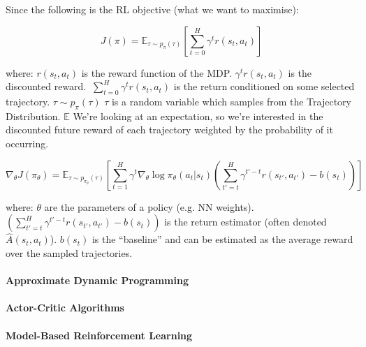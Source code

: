 \documentclass{article}
\begin{document}
Since the following is the RL objective (what we want to maximise):

\begin{equation}
\label{eq:1}
J(\pi) = \mathbb{E}_{\tau \sim p_\pi (\tau)} \left[ \sum_{t=0}^H \gamma^t r(s_t, a_t) \right ]
\end{equation}

where: \(r(s_t, a_t)\) is the reward function of the MDP. \(\gamma^t r(s_t , a_t)\) is the discounted reward. \(\ \sum_{t=0}^H \gamma^t r(s_t, a_t) \) is the return conditioned on some selected trajectory. \(\tau \sim p_\pi(\tau)\)
\(\tau\) is a random variable which samples from the Trajectory Distribution. \(\mathbb{E}\) We're looking at an expectation, so we're interested in the discounted future reward of each trajectory weighted by the probability of it occurring.

\begin{equation}
\label{eq:2}
\nabla_\theta J(\pi_\theta) = \mathbb{E}_{\tau \sim p_{\pi_\theta} (\tau)} \left [ \sum_{t=1}^H \gamma^t \nabla_\theta \log \pi_\theta (a_t | s_t) \left( \sum_{t' = t}^H \gamma^{t'-t} r(s_{t'}, a_{t'}) - b(s_t) \right) \right]
\end{equation}

where: \(\theta\) are the parameters of a policy (e.g. NN weights). \( \left( \sum_{t' = t}^H \gamma^{t'-t} r(s_{t'}, a_{t'}) - b(s_t) \right) \) is the return estimator (often denoted \(\hat{A}(s_{t}, a_{t})\)). \(b(s_{t})\) is the ``baseline'' and can be estimated as the average reward over the sampled trajectories.

\paragraph{Approximate Dynamic Programming}

\paragraph{Actor-Critic Algorithms}

\paragraph{Model-Based Reinforcement Learning}
\end{document}
